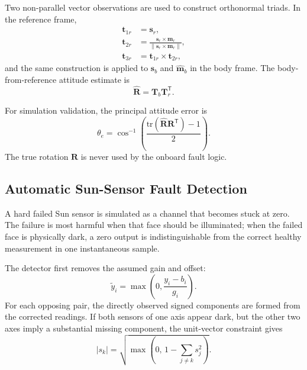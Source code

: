 \documentclass[11pt,a4paper]{article}
\begin{document}
Two non-parallel vector observations are used to construct orthonormal triads. In the reference frame,
\begin{align}
    \mathbf{t}_{1r}&=\mathbf{s}_r,\\
    \mathbf{t}_{2r}&=
    \frac{\mathbf{s}_r\times\mathbf{m}_r}
    {\|\mathbf{s}_r\times\mathbf{m}_r\|},\\
    \mathbf{t}_{3r}&=\mathbf{t}_{1r}\times\mathbf{t}_{2r},
\end{align}
and the same construction is applied to $\hat{\mathbf{s}}_b$ and $\hat{\mathbf{m}}_b$ in the body frame. The body-from-reference attitude estimate is
\begin{equation}
    \hat{\mathbf{R}}=\mathbf{T}_b\mathbf{T}_r^\mathsf{T}.
\end{equation}

For simulation validation, the principal attitude error is
\begin{equation}
    \theta_e=
    \cos^{-1}\left(
    \frac{\mathrm{tr}(\hat{\mathbf{R}}\mathbf{R}^{\mathsf T})-1}{2}
    \right).
\end{equation}
The true rotation $\mathbf{R}$ is never used by the onboard fault logic.

\subsection{Automatic Sun-Sensor Fault Detection}

A hard failed Sun sensor is simulated as a channel that becomes stuck at zero. The failure is most harmful when that face should be illuminated; when the failed face is physically dark, a zero output is indistinguishable from the correct healthy measurement in one instantaneous sample.

The detector first removes the assumed gain and offset:
\begin{equation}
    \tilde y_i=
    \max\left(0,\frac{y_i-b_i}{g_i}\right).
\end{equation}
For each opposing pair, the directly observed signed components are formed from the corrected readings. If both sensors of one axis appear dark, but the other two axes imply a substantial missing component, the unit-vector constraint gives
\begin{equation}
    |s_k|=
    \sqrt{
        \max\left(
            0,\,
            1-\sum_{j\neq k}s_j^2
        \right)
    }.
\end{equation}
\end{document}
